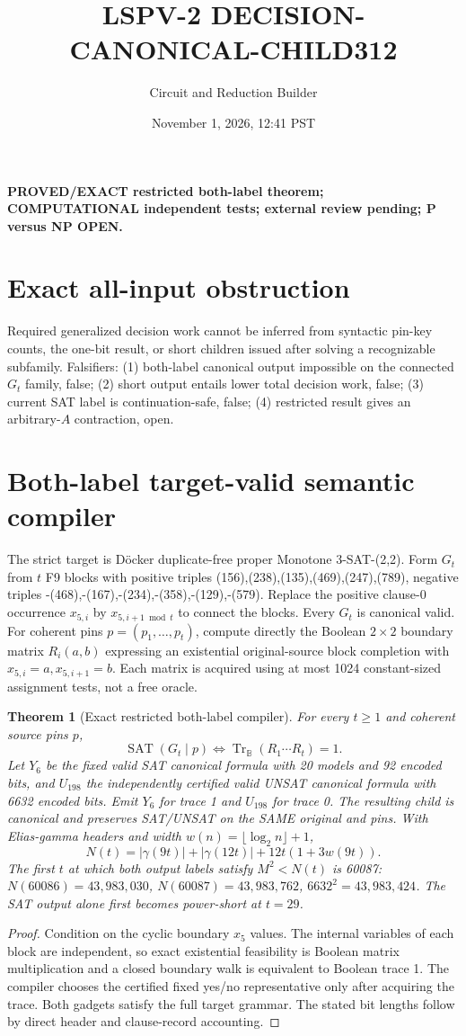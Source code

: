 \documentclass[11pt]{article}
\title{LSPV-2 DECISION-CANONICAL-CHILD312}
\author{Circuit and Reduction Builder}
\date{November 1, 2026, 12:41 PST}
\newtheorem{theorem}{Theorem}
\begin{document}
\maketitle
\noindent\textbf{PROVED/EXACT restricted both-label theorem; COMPUTATIONAL independent tests; external review pending; P versus NP OPEN.}
\section{Exact all-input obstruction}
Required generalized decision work cannot be inferred from syntactic pin-key counts, the one-bit result, or short children issued after solving a recognizable subfamily. Falsifiers: (1) both-label canonical output impossible on the connected $G_t$ family, false; (2) short output entails lower total decision work, false; (3) current SAT label is continuation-safe, false; (4) restricted result gives an arbitrary-$A$ contraction, open.
\section{Both-label target-valid semantic compiler}
The strict target is D\"ocker duplicate-free proper Monotone 3-SAT-(2,2). Form $G_t$ from $t$ F9 blocks with positive triples (156),(238),(135),(469),(247),(789), negative triples -(468),-(167),-(234),-(358),-(129),-(579). Replace the positive clause-0 occurrence $x_{5,i}$ by $x_{5,i+1\bmod t}$ to connect the blocks. Every $G_t$ is canonical valid.
For coherent pins $p=(p_1,\ldots,p_t)$, compute directly the Boolean $2\times2$ boundary matrix $R_i(a,b)$ expressing an existential original-source block completion with $x_{5,i}=a,x_{5,i+1}=b$. Each matrix is acquired using at most 1024 constant-sized assignment tests, not a free oracle.
\begin{theorem}[Exact restricted both-label compiler]
For every $t\ge1$ and coherent source pins $p$,
\[
\operatorname{SAT}(G_t\mid p)\iff\operatorname{Tr}_{\mathbb B}(R_1\cdots R_t)=1.
\]
Let $Y_6$ be the fixed valid SAT canonical formula with 20 models and 92 encoded bits, and $U_{198}$ the independently certified valid UNSAT canonical formula with 6632 encoded bits. Emit $Y_6$ for trace 1 and $U_{198}$ for trace 0. The resulting child is canonical and preserves SAT/UNSAT on the SAME original and pins. With Elias-gamma headers and width $w(n)=\lfloor\log_2 n\rfloor+1$,
\[
N(t)=|\gamma(9t)|+|\gamma(12t)|+12t(1+3w(9t)).
\]
The first $t$ at which both output labels satisfy $M^2<N(t)$ is 60087:
$N(60086)=43{,}983{,}030$, $N(60087)=43{,}983{,}762$, $6632^2=43{,}983{,}424$. The SAT output alone first becomes power-short at $t=29$.
\end{theorem}
\begin{proof}
Condition on the cyclic boundary $x_5$ values. The internal variables of each block are independent, so exact existential feasibility is Boolean matrix multiplication and a closed boundary walk is equivalent to Boolean trace 1. The compiler chooses the certified fixed yes/no representative only after acquiring the trace. Both gadgets satisfy the full target grammar. The stated bit lengths follow by direct header and clause-record accounting.
\end{proof}
\end{document}
